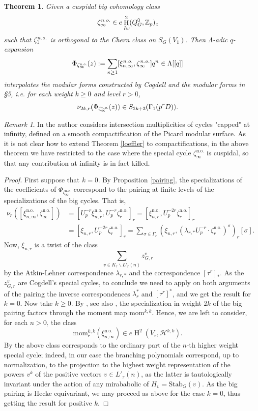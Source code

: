 \documentclass[12pt,a4paper,reqno]{amsart}
\theoremstyle{definition}
\numberwithin{definition}{subsection}
\theoremstyle{definition}
\numberwithin{Definition}{subsection}
\theoremstyle{remark}
\theoremstyle{remark}
\numberwithin{Remark}{subsection}
\theoremstyle{remark}
\newtheorem*{remark}{Remark}
\theoremstyle{plain}
\newtheorem{Theorem}{Theorem}
\numberwithin{Theorem}{subsection}
\theoremstyle{plain}
\theoremstyle{plain}
\theoremstyle{plain}
\theoremstyle{plain}
\theoremstyle{plain}
\theoremstyle{plain}
\theoremstyle{plain}
\newcommand*{\Z}{\mathbb{Z}}
\DeclareMathOperator{\h}{H}
\begin{document}
\begin{Theorem}
\label{bigcog}
Given a cuspidal big cohomology class $$\zeta_\infty^{\emph{n.o.}}\in e\h_{\emph{Iw}}^2(Q^0_G,\Z_p)_{c}$$ such that $\zeta^{\emph{n.o.}}_1$ is orthogonal to the Chern class on $S_{G}(V_1)$. Then $\Lambda$-adic $q$-expansion
\[
\Phi_{\zeta_\infty^{\emph{n.o.}}}(z):=\sum_{n\geq 1}[\xi_{n,\infty}^{\emph{n.o.}}, \zeta_\infty^{\emph{n.o.}}] q^n\in \Lambda[[q]]
\]
interpolates the modular forms constructed by Cogdell and the modular forms in \S 5, i.e. for each weight $k\geq 0$ and level $r> 0$, 
\[
\nu_{2k,r}(\Phi_{\zeta_\infty^{\emph{n.o.}}}(z))\in S_{2k+3}(\Gamma_1(p^rD)).
\]
\end{Theorem}
\begin{remark}
In \cite{cogdell} the author considers intersection multiplicities of cycles "capped" at infinity, defined on a smooth compactification of the Picard modular surface. As it is not clear how to extend Theorem \ref{loeffler} to compactifications, in the above theorem we have restricted to the case where the special cycle $\zeta_\infty^{\text{n.o.}}$ is cuspidal, so that any contribution at infinity is in fact killed.
\end{remark}
\begin{proof}
First suppose that $k=0$.
By Proposition \ref{pairing}, the specializations of the coefficients of $\Phi_{\zeta_\infty^{\text{n.o.}}}$ correspond to the pairing at finite levels of the specializations of the big cycles. That is,
\begin{align*}
\nu_{r}([\xi_{n,\infty}^{\text{n.o.}}, \zeta_\infty^{\text{n.o.}}])&=[U^{-r}_p\xi_{n,r}^{\text{n.o.}},U^{-r}_p\zeta_r^{\text{n.o.}}]_r=[\xi_{n,r}^{\text{n.o.}},U^{-2r}_p\zeta_r^{\text{n.o.}}]_r\\
&=[\xi_{n,r},U^{-2r}_p\zeta_r^{\text{n.o.}}]_r=\sum_{\sigma\in \Gamma_r}(\xi_{n,r},(\lambda_{r,*}U_p^{-r}\cdot \zeta_r^{\text{n.o.}})^\sigma)_r[\sigma].
\end{align*}
Now, $\xi_{n,r}$ is a twist of the class 
\[
\sum_{v\in K_r\backslash L'_r(n)} z_{G,r}^v
\]
by the Atkin-Lehner correspondence $\lambda_{r,*}$ and the correspondence $[\tau^r]_*$. As the $z_{G,r}^v$ are Cogdell's special cycles, to conclude we need to apply on both arguments of the pairing the inverse correspondences $\lambda_r^*$ and $[\tau^r]^*$, and we get the result for $k=0$. Now take $k\geq 0$. By \cite[Corollary 3.4 and Theorem 3.3]{hida89}, see also \cite[Theorem 7.8]{nicole}, the specialization in weight $2k$ of the big pairing factors through the moment map $\text{mom}^{k,k}$. Hence, we are left to consider, for each $n>0$, the class
\[
\text{mom}^{k,k}_r(\xi_{n,\infty}^{\text{n.o.}})\in e\h^2(V_r,\mathcal{H}^{k,k}).
\]
By \cite[Theorem 5.2.3]{rockwood} the above class corresponds to the ordinary part of the $n$-th higher weight special cycle; indeed, in our case the branching polynomials correspond, up to normalization, to the projection to the highest weight representation of the powers $v^{k}$ of the positive vectors $v\in L'_r(n)$, as the latter is tautologically invariant under the action of any mirababolic of $H_v=\text{Stab}_G(v)$. As the big pairing is Hecke equivariant, we may proceed as above for the case $k=0$, thus getting the result for positive $k$.
\end{proof}
\end{document}
